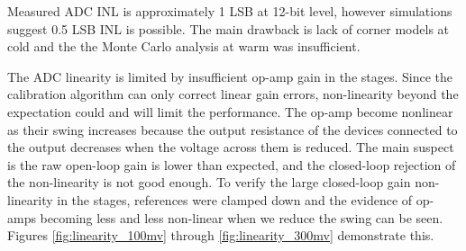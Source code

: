 \label{sec:5.3}


Measured ADC INL is approximately 1 LSB at 12-bit level, however simulations suggest 0.5 LSB INL is possible. The main drawback is lack of corner models at cold and the the Monte Carlo analysis at warm was insufficient.





The ADC linearity is limited by insufficient op-amp gain in the stages. Since the calibration algorithm can only correct linear gain errors, non-linearity beyond the expectation could and will limit the performance. The op-amp become nonlinear as their swing increases because the output resistance of the devices connected to the output decreases when the voltage across them is reduced. The main suspect is the raw open-loop gain is lower than expected, and the closed-loop rejection of the non-linearity is not good enough. To verify the large closed-loop gain non-linearity in the stages, references were clamped down and the evidence of op-amps becoming less and less non-linear when we reduce the swing can be seen. Figures \ref{fig:linearity_100mv} through \ref{fig:linearity_300mv} demonstrate this. 


